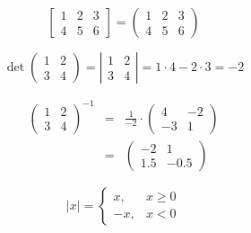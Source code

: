 \documentclass{article}
\begin{document}
\begin{equation*}
\left[ %
\begin{array}{ccc} %
1 & 2 & 3\\
4 & 5 & 6
\end{array}
\right] %
=
\left( %
\begin{array}{ccc}
1 & 2 & 3\\
4 & 5 & 6
\end{array}
\right) %
\end{equation*}


\begin{equation}
\det 
\left(
\begin{array}{cc}
1 & 2\\
3 &4
\end{array}
\right)
=
\left|
\begin{array}{cc}
1 & 2\\
3 &4
\end{array}
\right|
=1\cdot 4-2\cdot 3=-2
\end{equation}

\begin{eqnarray}
\left(\begin{array}{cc}
1 & 2\\
3 &4
\end{array}\right)^{-1}
&=&
\frac{1}{-2}\cdot
\left(
\begin{array}{rr}
4 & -2\\
-3 &1
\end{array}\right) \\[2mm]
&=&
\left(
\begin{array}{rr}
-2 & 1\\
1.5 &-0.5
\end{array}\right) \nonumber
\end{eqnarray}


\begin{equation}
|x|= 
\left\{ %
\begin{array}{rc}
x,& x\ge 0\\
-x, & x<0
\end{array}
\right. %
\end{equation}
\end{document}
